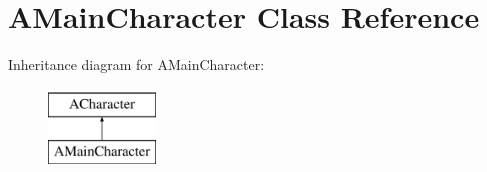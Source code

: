 \hypertarget{class_a_main_character}{}\section{A\+Main\+Character Class Reference}
\label{class_a_main_character}
Inheritance diagram for A\+Main\+Character\+:\begin{figure}[H]
\begin{center}
\leavevmode
\includegraphics[height=2.000000cm]{class_a_main_character}
\end{center}
\end{figure}
